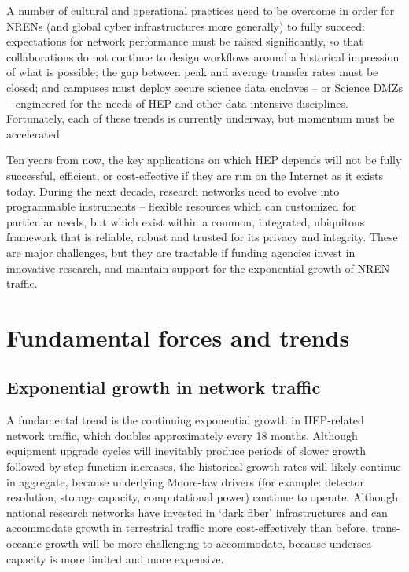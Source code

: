 A number of cultural and operational practices need to be overcome in order for NRENs (and global cyber infrastructures more generally) to fully succeed: expectations for network performance must be raised significantly, so that collaborations do not continue to design workflows around a historical impression of what is possible; the gap between peak and average transfer rates must be closed; and campuses must deploy secure science data enclaves – or  Science DMZs\cite{DMZ} – engineered for the needs of HEP and other data-intensive disciplines.  Fortunately, each of these trends is currently underway, but momentum must be accelerated.   

Ten years from now, the key applications on which HEP depends will not be fully successful, efficient, or cost-effective if they are run on the Internet as it exists today. During the next decade, research networks need to evolve into programmable instruments – flexible resources which can customized for particular needs, but which exist within a common, integrated, ubiquitous framework that is reliable, robust and trusted for its privacy and integrity. These are major challenges, but they are tractable if funding agencies invest in innovative research, and maintain support for the exponential growth of NREN traffic. 


\section{Fundamental forces and trends}
\label{sec:comp-forces}

\subsection{Exponential growth in network traffic}

A fundamental trend is the continuing exponential growth in HEP-related network traffic, which doubles approximately every 18 months. Although equipment upgrade cycles will inevitably produce periods of slower growth followed by step-function increases, the historical growth rates will likely continue in aggregate, because underlying Moore-law drivers (for example: detector resolution, storage capacity, computational power) continue to operate. Although national research networks have invested in ‘dark fiber’ infrastructures and can accommodate growth in terrestrial traffic more cost-effectively than before, trans-oceanic growth will be more challenging to accommodate, because undersea capacity is more limited and more expensive. 


